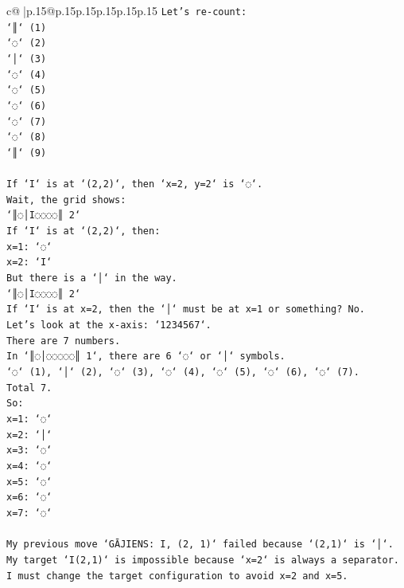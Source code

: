 \documentclass{article}
\begin{document}
{\begin{supertabular}{c@{$\;$}|p{.15\linewidth}@{}p{.15\linewidth}p{.15\linewidth}p{.15\linewidth}p{.15\linewidth}p{.15\linewidth}}
{{{\texttt{Let's re{-}count:} \\
\texttt{`║` (1)} \\
\texttt{`◌` (2)} \\
\texttt{`│` (3)} \\
\texttt{`◌` (4)} \\
\texttt{`◌` (5)} \\
\texttt{`◌` (6)} \\
\texttt{`◌` (7)} \\
\texttt{`◌` (8)} \\
\texttt{`║` (9)} \\
\\ 
\texttt{If `I` is at `(2,2)`, then `x=2, y=2` is `◌`.} \\
\texttt{Wait, the grid shows:} \\
\texttt{`║◌│I◌◌◌◌║ 2`} \\
\texttt{If `I` is at `(2,2)`, then:} \\
\texttt{x=1: `◌`} \\
\texttt{x=2: `I`} \\
\texttt{But there is a `│` in the way.} \\
\texttt{`║◌│I◌◌◌◌║ 2`} \\
\texttt{If `I` is at x=2, then the `│` must be at x=1 or something? No.} \\
\texttt{Let's look at the x{-}axis: `1234567`.} \\
\texttt{There are 7 numbers.} \\
\texttt{In `║◌│◌◌◌◌◌║ 1`, there are 6 `◌` or `│` symbols.} \\
\texttt{`◌` (1), `│` (2), `◌` (3), `◌` (4), `◌` (5), `◌` (6), `◌` (7).} \\
\texttt{Total 7.} \\
\texttt{So:} \\
\texttt{x=1: `◌`} \\
\texttt{x=2: `│`} \\
\texttt{x=3: `◌`} \\
\texttt{x=4: `◌`} \\
\texttt{x=5: `◌`} \\
\texttt{x=6: `◌`} \\
\texttt{x=7: `◌`} \\
\\ 
\texttt{My previous move `GĀJIENS: I, (2, 1)` failed because `(2,1)` is `│`.} \\
\texttt{My target `I(2,1)` is impossible because `x=2` is always a separator.} \\
\texttt{I must change the target configuration to avoid x=2 and x=5.} \\
}}}
\end{supertabular}}
\end{document}
